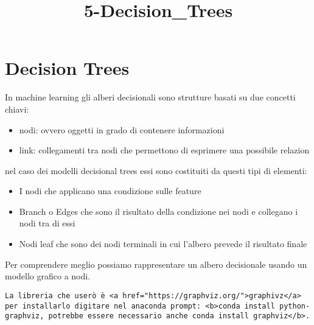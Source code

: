 \documentclass[11pt]{article}
\title{5-Decision\_Trees}
\providecommand{\tightlist}{%
      \setlength{\itemsep}{0pt}\setlength{\parskip}{0pt}}
\begin{document}
    
    \maketitle
    
    

    
    \hypertarget{decision-trees}{%
\section{Decision Trees}\label{decision-trees}}

In machine learning gli alberi decisionali sono strutture basati su due
concetti chiavi:

\begin{itemize}
\tightlist
\item
  nodi: ovvero oggetti in grado di contenere informazioni
\item
  link: collegamenti tra nodi che permettono di esprimere una possibile
  relazion
\end{itemize}

nel caso dei modelli decisional trees essi sono costituiti da questi
tipi di elementi:

\begin{itemize}
\tightlist
\item
  I nodi che applicano una condizione sulle feature
\item
  Branch o Edges che sono il risultato della condizione nei nodi e
  collegano i nodi tra di essi
\item
  Nodi leaf che sono dei nodi terminali in cui l'albero prevede il
  risultato finale
\end{itemize}

Per comprendere meglio possiamo rappresentare un albero decisionale
usando un modello grafico a nodi.

\begin{verbatim}
La libreria che userò è <a href="https://graphviz.org/">graphivz</a> per installarlo digitare nel anaconda prompt: <b>conda install python-graphviz, potrebbe essere necessario anche conda install graphviz</b>.
\end{verbatim}
\end{document}
